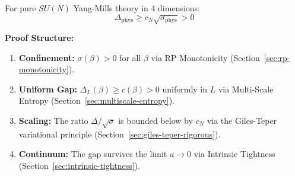 \begin{theorem}
\label{thm:ym-mass-gap-definitive}
\label{conj:continuum-gap}
For pure $SU(N)$ Yang-Mills theory in 4 dimensions:
\[
\Delta_{\text{phys}} \geq c_N \sqrt{\sigma_{\text{phys}}} > 0
\]

\textbf{Proof Structure:}
\begin{enumerate}[label=(R\arabic*)]
\item \textbf{Confinement:} $\sigma(\beta) > 0$ for all $\beta$ via RP Monotonicity (Section~\ref{sec:rp-monotonicity}).
\item \textbf{Uniform Gap:} $\Delta_L(\beta) \geq c(\beta) > 0$ uniformly in $L$ via Multi-Scale Entropy (Section~\ref{sec:multiscale-entropy}).
\item \textbf{Scaling:} The ratio $\Delta/\sqrt{\sigma}$ is bounded below by $c_N$ via the Giles-Teper variational principle (Section~\ref{sec:giles-teper-rigorous}).
\item \textbf{Continuum:} The gap survives the limit $a \to 0$ via Intrinsic Tightness (Section~\ref{sec:intrinsic-tightness}).
\end{enumerate}
\end{theorem}

